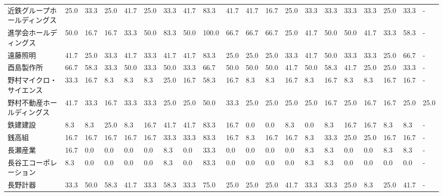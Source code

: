 \documentclass[a4paper，11pt]{jsarticle}
\begin{document}
\begin{longtable}[c]{lp{3mm}p{3mm}p{3mm}p{3mm}p{3mm}p{3mm}p{3mm}p{3mm}p{3mm}p{3mm}p{3mm}p{3mm}p{3mm}p{3mm}p{3mm}p{3mm}p{3mm}p{3mm}p{3mm}}
近鉄グループホールディングス  &   25.0 &   33.3 &      25.0 &      41.7 &       25.0 &   33.3 &   41.7 &   83.3 &    41.7 &    41.7 &   16.7 &  25.0 &   33.3 &    33.3 &    33.3 &  33.3 &  25.0 &  33.3 &     - \\
進学会ホールディングス     &   50.0 &   16.7 &      16.7 &      33.3 &       50.0 &   83.3 &   50.0 &  100.0 &    66.7 &    66.7 &   66.7 &  25.0 &   41.7 &    50.0 &    50.0 &  41.7 &  33.3 &  58.3 &     - \\
遠藤照明            &   41.7 &   25.0 &      33.3 &      41.7 &       33.3 &   41.7 &   41.7 &   83.3 &    25.0 &    25.0 &   25.0 &  33.3 &   41.7 &    50.0 &    33.3 &  33.3 &  25.0 &  66.7 &     - \\
酉島製作所           &   66.7 &   58.3 &      33.3 &      50.0 &       33.3 &   50.0 &   33.3 &   66.7 &    50.0 &    50.0 &   50.0 &  41.7 &   50.0 &    58.3 &    41.7 &  25.0 &  25.0 &  33.3 &     - \\
野村マイクロ・サイエンス    &   33.3 &   16.7 &       8.3 &       8.3 &        8.3 &   25.0 &   16.7 &   58.3 &    16.7 &     8.3 &    8.3 &  16.7 &    8.3 &    16.7 &     8.3 &   8.3 &  16.7 &  16.7 &     - \\
野村不動産ホールディングス   &   41.7 &   33.3 &      16.7 &      33.3 &       33.3 &   25.0 &   25.0 &   50.0 &    33.3 &    25.0 &   25.0 &  25.0 &   25.0 &    16.7 &    25.0 &  16.7 &  16.7 &  25.0 &  25.0 \\
鉄建建設            &    8.3 &    8.3 &      25.0 &       8.3 &       16.7 &   41.7 &   41.7 &   83.3 &    16.7 &     0.0 &    0.0 &   8.3 &    0.0 &     8.3 &    16.7 &  16.7 &   8.3 &   8.3 &     - \\
銭高組             &   16.7 &   16.7 &      16.7 &      16.7 &       16.7 &   33.3 &   33.3 &   83.3 &    16.7 &     8.3 &   16.7 &  16.7 &    8.3 &    33.3 &    25.0 &  25.0 &  16.7 &  16.7 &     - \\
長瀬産業            &   16.7 &    0.0 &       0.0 &       0.0 &        0.0 &    8.3 &    0.0 &   33.3 &     0.0 &     0.0 &    0.0 &   0.0 &    8.3 &     8.3 &     0.0 &   0.0 &   8.3 &   8.3 &     - \\
長谷工コーポレーション     &    8.3 &    0.0 &       0.0 &       0.0 &        0.0 &    8.3 &    0.0 &   83.3 &     0.0 &     0.0 &    0.0 &   0.0 &    8.3 &     8.3 &     0.0 &   0.0 &   0.0 &   0.0 &     - \\
長野計器            &   33.3 &   50.0 &      58.3 &      41.7 &       33.3 &   58.3 &   33.3 &   75.0 &    25.0 &    25.0 &   25.0 &  41.7 &   33.3 &    33.3 &    25.0 &   8.3 &  25.0 &  41.7 &     - \\

\end{longtable}
\end{document}
